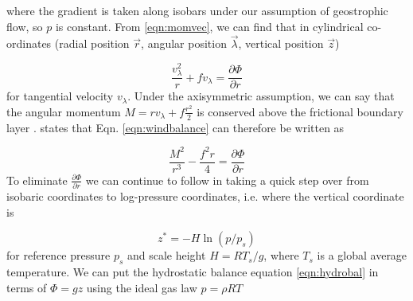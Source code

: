  





where the gradient is taken along isobars under our assumption of geostrophic flow, so $p$ is constant. From \ref{eqn:momvec}, we can find that in cylindrical co-ordinates (radial position $\vec{r}$, angular position $\vec{\lambda}$, vertical position $\vec{z}$)

\begin{equation}
    \frac{v_{\lambda}^2}{r}+fv_{\lambda}=\frac{\partial \Phi}{\partial r}
    \label{eqn:windbalance}
\end{equation}
for tangential velocity $v_{\lambda}$. Under the axisymmetric assumption, we can say that the angular momentum $M=rv_{\lambda}+f\frac{r^2}{2}$ is conserved above the frictional boundary layer \cite{smith_montgomery_2017}. \cite{holton_hakim_2019} states that Eqn. \ref{eqn:windbalance} can therefore be written as 

\begin{equation}
    \frac{M^2}{r^3}-\frac{f^2r}{4}=\frac{\partial\Phi}{\partial r}
    \label{eqn:windbalance_mom}
\end{equation}
To eliminate $\frac{\partial \Phi}{\partial r}$ we can continue to follow \cite{holton_hakim_2019} in taking a quick step over from isobaric coordinates to log-pressure coordinates, i.e. where the vertical coordinate is 

\begin{equation*}
    z^*=-H\ln(p/p_s)
\end{equation*}
for reference pressure $p_s$ and scale height $H=RT_s/g$, where $T_s$ is a global average temperature. We can put the hydrostatic balance equation \ref{eqn:hydrobal} in terms of $\Phi= gz$ using the ideal gas law $p=\rho RT$

